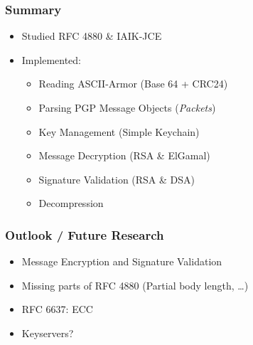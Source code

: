 \documentclass{beamer}
\begin{document}
\begin{frame}
	\frametitle{Summary}
	
	\begin{itemize}
		\item Studied RFC 4880 \&{} IAIK-JCE
		\item Implemented:
		\begin{itemize}
			\item Reading ASCII-Armor (Base 64 + CRC24)
			\item Parsing PGP Message Objects (\textit{Packets})
			\item Key Management (Simple Keychain)
			\item Message Decryption (RSA \&{} ElGamal)
			\item Signature Validation (RSA \&{} DSA)
			\item Decompression
		\end{itemize}
	\end{itemize}
	
\end{frame}


\begin{frame}
	\frametitle{Outlook / Future Research}
	
	\begin{itemize}
		\item Message Encryption and Signature Validation
		\item Missing parts of RFC 4880 (Partial body length, \ldots)
		\item RFC 6637: ECC
		\item Keyservers?
	\end{itemize}
	
	
\end{frame}
\end{document}
